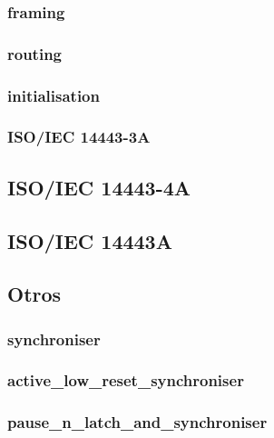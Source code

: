 \documentclass[a4paper, twoside, 11pt]{report}
\begin{document}
\subsubsection{framing}

\FloatBarrier
\subsubsection{routing}

\FloatBarrier
\subsubsection{initialisation}

\FloatBarrier
\subsubsection{ISO/IEC 14443-3A}

\FloatBarrier
\subsection{ISO/IEC 14443-4A}

\FloatBarrier
\subsection{ISO/IEC 14443A}

\FloatBarrier
\subsection{Otros}

\FloatBarrier
\subsubsection{synchroniser}

\FloatBarrier
\subsubsection{active\_low\_reset\_synchroniser}

\FloatBarrier
\subsubsection{pause\_n\_latch\_and\_synchroniser}
\end{document}
